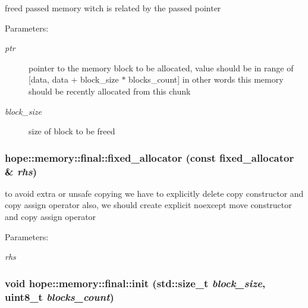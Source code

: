 freed passed memory witch is related by the passed pointer 

\begin{Desc}
\item[Parameters:]
\begin{description}
\item[{\em ptr}]pointer to the memory block to be allocated, value should be in range of \mbox{[}data, data + block\_\-size $\ast$ blocks\_\-count\mbox{]} in other words this memory should be recently allocated from this chunk \item[{\em block\_\-size}]size of block to be freed \end{description}
\end{Desc}
\hypertarget{structhope_1_1memory_1_1final_3e02f1cf966f5447a579d51afa98330c}{
\subsubsection[{fixed\_\-allocator}]{\setlength{\rightskip}{0pt plus 5cm}hope::memory::final::fixed\_\-allocator (const fixed\_\-allocator \& {\em rhs})}}
\label{structhope_1_1memory_1_1final_3e02f1cf966f5447a579d51afa98330c}


to avoid extra or unsafe copying we have to explicitly delete copy constructor and copy assign operator also, we should create explicit noexcept move constructor and copy assign operator 

\begin{Desc}
\item[Parameters:]
\begin{description}
\item[{\em rhs}]\end{description}
\end{Desc}
\hypertarget{structhope_1_1memory_1_1final_4ceb422bbc652ee386c8458abc959425}{
\subsubsection[{init}]{\setlength{\rightskip}{0pt plus 5cm}void hope::memory::final::init (std::size\_\-t {\em block\_\-size}, \/  uint8\_\-t {\em blocks\_\-count})}}
\label{structhope_1_1memory_1_1final_4ceb422bbc652ee386c8458abc959425}


